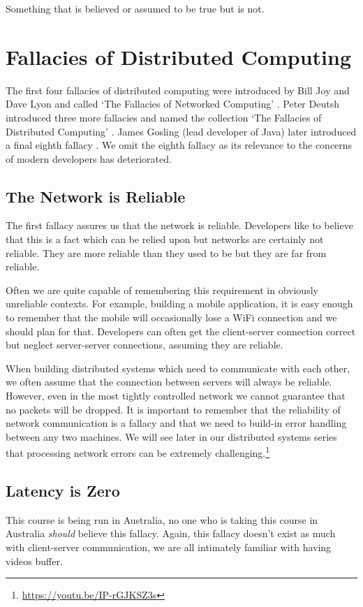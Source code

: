 \begin{definition}[Fallacy]
Something that is believed or assumed to be true but is not.
\end{definition}

\section{Fallacies of Distributed Computing}
The first four fallacies of distributed computing were introduced by Bill Joy and Dave Lyon and called `The Fallacies of Networked Computing' \cite{four-fallacies}.
Peter Deutsh introduced three more fallacies and named the collection `The Fallacies of Distributed Computing' \cite{eight-fallacies}.
James Gosling (lead developer of Java) later introduced a final eighth fallacy \cite{four-fallacies}.
We omit the eighth fallacy as its relevance to the concerns of modern developers has deteriorated.

\subsection{The Network is Reliable}
The first fallacy assures us that the network is reliable.
Developers like to believe that this is a fact which can be relied upon but networks are certainly not reliable.
They are more reliable than they used to be but they are far from reliable.

Often we are quite capable of remembering this requirement in obviously unreliable contexts.
For example, building a mobile application,
it is easy enough to remember that the mobile will occasionally lose a WiFi connection and we should plan for that.
Developers can often get the client-server connection correct but neglect server-server connections,
assuming they are reliable.

When building distributed systems which need to communicate with each other,
we often assume that the connection between servers will always be reliable.
However, even in the most tightly controlled network we cannot guarantee that no packets will be dropped.
It is important to remember that the reliability of network communication is a fallacy and that we need to build-in error handling between any two machines.
We will see later in our distributed systems series that processing network errors can be extremely challenging.\footnote{\url{https://youtu.be/IP-rGJKSZ3s}}

\subsection{Latency is Zero}
This course is being run in Australia,
no one who is taking this course in Australia \textsl{should} believe this fallacy.
Again, this fallacy doesn't exist as much with client-server communication,
we are all intimately familiar with having videos buffer.

